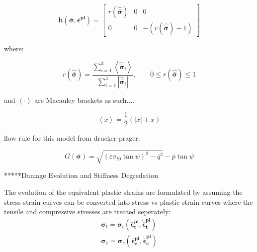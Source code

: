 \begin{equation}
\mathbf{h}\left(\boldsymbol{\bar{\sigma}},\boldsymbol{\bar{\epsilon}^{pl}}\right)=\left[\begin{array}{ccc}
r\left(\boldsymbol{\hat{\bar{\sigma}}}\right) & 0 & 0\\
0 & 0 & -\left(r\left(\boldsymbol{\hat{\bar{\sigma}}}\right)-1\right)
\end{array}\right]\label{eqn:const9-1}
\end{equation}

where:

\begin{equation}
r\left(\hat{\boldsymbol{\bar{\sigma}}}\right)=\frac{\sum_{i=1}^{3}\left\langle \hat{\boldsymbol{\bar{\sigma}}}_{i}\right\rangle }{\sum_{i=1}^{3}\left|\hat{\boldsymbol{\bar{\sigma}}}_{i}\right|},\qquad0\leq r\left(\hat{\boldsymbol{\bar{\sigma}}}\right)\leq1\label{eqn:const9-2}
\end{equation}


and $\left\langle \cdotp\right\rangle $ are Macauley brackets as
such....

\begin{equation}
\left\langle x\right\rangle =\frac{1}{2}\left(\left|x\right|+x\right)\label{eqn:const9-3}
\end{equation}


flow rule for this model from drucker-prager:

\begin{equation}
G\left(\boldsymbol{\bar{\sigma}}\right)=\sqrt{\left(\varepsilon\sigma_{t0}\tan\psi\right)^{2}-\bar{q}^{2}}-\bar{p}\tan\psi\label{eqn:const11}
\end{equation}


{*}{*}{*}{*}{*}Damage Evolution and Stiffness Degredation

The evolution of the equivalent plastic strains are formulated by
assuming the stress-strain curves can be converted into stress vs
plastic strain curves where the tensile and compressive stresses are
treated seperately: 
\begin{equation}
\begin{array}{c}
\boldsymbol{\sigma}_{t}=\boldsymbol{\sigma}_{t}\left(\boldsymbol{\bar{\epsilon}_{t}^{pl}},\boldsymbol{\dot{\bar{\epsilon}}_{t}^{pl}}\right)\\
\boldsymbol{\sigma}_{c}=\boldsymbol{\sigma}_{c}\left(\boldsymbol{\bar{\epsilon}_{c}^{pl}},\boldsymbol{\dot{\bar{\epsilon}}_{c}^{pl}}\right)
\end{array}
\label{eqn:dam1}
\end{equation}


